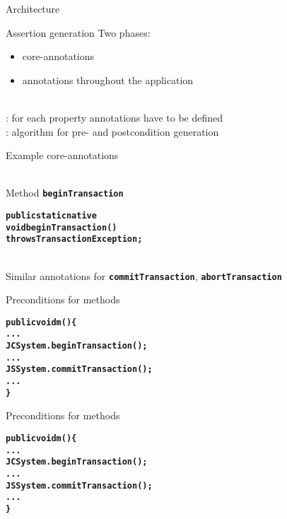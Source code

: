 \documentclass[final,nocolorBG,a4,marieke,nototal,ps, accumulate,slideColor]{prosper}
\newcommand{\textttbf}[1]{\texttt{\textbf{#1}}}
\begin{document}
\begin{slide}{Architecture}
\end{slide}

\begin{slide}{Assertion generation}
Two phases:
\begin{itemize}
\item {} core-annotations
\item {} annotations throughout the application
\end{itemize}
\ \smallskip\\
: for each property annotations have to be defined
\bigskip\\
: algorithm for pre- and postcondition generation
\end{slide}

\begin{slide}{Example core-annotations}
\begin{alltt}
\end{alltt}
\ \smallskip\\
Method \textttbf{beginTransaction}
\begin{alltt}
\textbf{public static native 
   void beginTransaction() 
        throws TransactionException;}
\end{alltt}
\ \smallskip\\
Similar annotations for \textttbf{commitTransaction},
\textttbf{abortTransaction} 
\end{slide}


\begin{slide}{Preconditions for methods}
\begin{alltt}
\textbf{public void m() \{
   ...
   JCSystem.beginTransaction();
   ...
   JSSystem.commitTransaction();
   ...
   \}}
\end{alltt}
\end{slide}

\begin{slide}{Preconditions for methods}
\begin{alltt}
\textbf{public void m() \{
   ...
   JCSystem.beginTransaction();
   ...
   JSSystem.commitTransaction();
   ...
   \}}
\end{alltt}
\ \smallskip\\
\end{slide}
\end{document}
